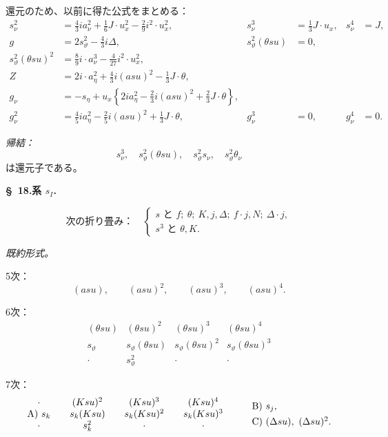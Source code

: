 \documentclass[11pt]{jlreq}
\newcommand{\A}{\Delta}
\begin{document}
還元のため、以前に得た公式をまとめる：
\[
\tag{24}
\begin{aligned}
s_\nu^2&=\frac43ia_\nu^2+\frac16J\cdot u_x^2-\frac29i^2\cdot u_x^2,
& s_\nu^3&=\frac13J\cdot u_x,
& s_\nu^4&=J,\\[0.3em]
g&=2s_\vartheta^2-\frac43i\A,
& s_\vartheta^2(\theta su)&=0,\\[0.3em]
s_\vartheta^2(\theta su)^2&=\frac89i\cdot a_\nu^3-\frac4{27}i^2\cdot u_x^2,\\[0.3em]
Z&=2i\cdot a_\eta^2+\frac43i(asu)^2-\frac13J\cdot\theta,\\[0.3em]
g_\nu&=-s_\eta+u_x\left\{2ia_\eta^2-\frac23i(asu)^2+\frac23J\cdot\theta\right\},\\[0.3em]
g_\nu^2&=\frac45ia_\eta^2-\frac25i(asu)^2+\frac13J\cdot\theta,
&g_\nu^3&=0,
&g_\nu^4&=0.
\end{aligned}
\]

\noindent\emph{帰結：}
\[
 s_\nu^3,
\quad s_\vartheta^2(\theta su),
\quad s_\vartheta^2s_\nu,
\quad s_\vartheta^2\theta_\nu
\]
は還元子である。



\clearpage
\begin{center}
\textbf{\S\ 18.\quad 系 $s_I$.}
\end{center}

\[
\text{次の折り畳み：}\quad
\left\{\begin{array}{l}
s\text{ と } f;\ \theta;\ K,j,\A;\ f\cdot j,N;\ \A\cdot j,\\
s^3\text{ と }\theta,K.
\end{array}\right.
\]

\noindent\emph{既約形式。}

\noindent 5次：
\[
(asu),\qquad (asu)^2,\qquad (asu)^3,\qquad (asu)^4.
\]

\noindent 6次：
\[
\begin{array}{cccc}
(\theta su)&(\theta su)^2&(\theta su)^3&(\theta su)^4\\
s_\vartheta&s_\vartheta(\theta su)&s_\vartheta(\theta su)^2&s_\vartheta(\theta su)^3\\
\cdot&s_\vartheta^2&\cdot&\cdot
\end{array}
\]

\noindent 7次：
\[
\begin{array}{c@{\qquad}c@{\qquad}c@{\qquad}c}
\cdot&(Ksu)^2&(Ksu)^3&(Ksu)^4\\
\text{A)}\ s_k&s_k(Ksu)&s_k(Ksu)^2&s_k(Ksu)^3\\
\cdot&s_k^2&\cdot&\cdot
\end{array}
\qquad
\begin{array}{l}
\text{B)}\ s_j,\\[0.4em]
\text{C)}\ (\A su),\ (\A su)^2.
\end{array}
\]
\end{document}
